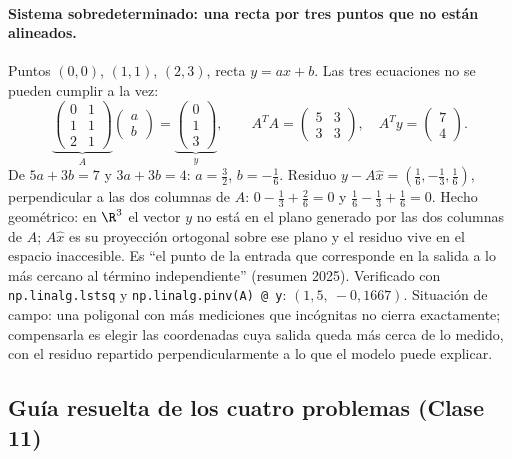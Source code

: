 \paragraph{Sistema sobredeterminado: una recta por tres puntos que no están alineados.}
Puntos \((0,0)\), \((1,1)\), \((2,3)\), recta \(y=ax+b\). Las tres ecuaciones no se pueden
cumplir a la vez:
\[
  \underbrace{\begin{pmatrix}0&1\\1&1\\2&1\end{pmatrix}}_{A}
  \begin{pmatrix}a\\b\end{pmatrix}
  =\underbrace{\begin{pmatrix}0\\1\\3\end{pmatrix}}_{y},\qquad
  A^TA=\begin{pmatrix}5&3\\3&3\end{pmatrix},\quad A^Ty=\begin{pmatrix}7\\4\end{pmatrix}.
\]
De \(5a+3b=7\) y \(3a+3b=4\): \(a=\tfrac32\), \(b=-\tfrac16\). Residuo
\(y-A\hat x=(\tfrac16,-\tfrac13,\tfrac16)\), perpendicular a las dos columnas de \(A\):
\(0-\tfrac13+\tfrac26=0\) y \(\tfrac16-\tfrac13+\tfrac16=0\). Hecho geométrico: en
\(\R^3\) el vector \(y\) no está en el plano generado por las dos columnas de \(A\);
\(A\hat x\) es su proyección ortogonal sobre ese plano y el residuo vive en el espacio
inaccesible. Es ``el punto de la entrada que corresponde en la salida a lo más cercano al
término independiente'' (resumen 2025). Verificado con \texttt{np.linalg.lstsq} y
\texttt{np.linalg.pinv(A) @ y}: \((1{,}5,\ -0{,}1667)\). Situación de campo: una poligonal
con más mediciones que incógnitas no cierra exactamente; compensarla es elegir las
coordenadas cuya salida queda más cerca de lo medido, con el residuo repartido
perpendicularmente a lo que el modelo puede explicar.

\subsection{Guía resuelta de los cuatro problemas (Clase 11)}\label{sec:cuatro-problemas}

{\small\vspace{1mm}\par}


